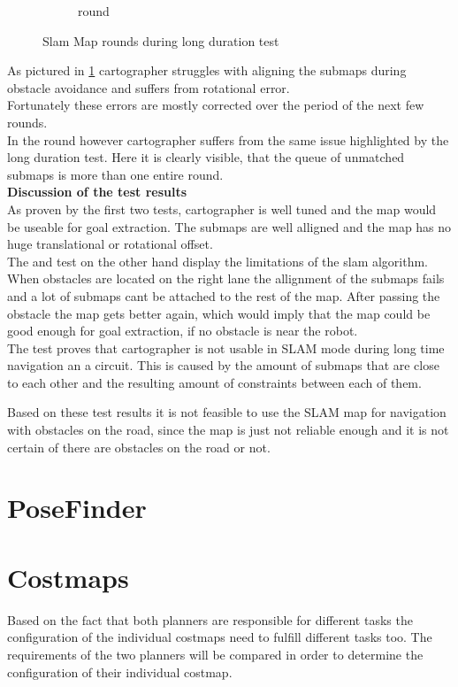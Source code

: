 \begin{figure}[H]
\begin{subfigure}{.3\linewidth}
		\caption{ round}
	\end{subfigure}

	\caption{Slam Map rounds during long duration test}
	\label{4slamtest}

\end{figure}

As pictured in \ref{4slamtest} cartographer struggles with aligning the submaps during obstacle avoidance and suffers from rotational error.\\
Fortunately these errors are mostly corrected over the period of the next few rounds.\\ In the  round however cartographer suffers from the same issue highlighted by the long duration test. Here it is clearly visible, that the queue of unmatched submaps is more than one entire round.\\

\textbf{Discussion of the test results}\\
As proven by the first two tests, cartographer is well tuned and the map would be useable for goal extraction. The submaps are well alligned and the map has no huge translational or rotational offset.\\

The  and  test on the other hand display the limitations of the slam algorithm.\\
When obstacles are located on the right lane the allignment of the submaps fails and a lot of submaps cant be attached to the rest of the map. After passing the obstacle the map gets better again, which would imply that the map could be good enough for goal extraction, if no obstacle is near the robot.\\
The  test proves that cartographer is not usable in SLAM mode during long time navigation an a circuit. This is caused by the amount of submaps that are close to each other and the resulting amount of constraints between each of them.

Based on these test results it is not feasible to use the SLAM map for navigation with obstacles on the road, since the map is just not reliable enough and it is not certain of there are obstacles on the road or not. 

\section{PoseFinder}



\section{Costmaps}
Based on the fact that both planners are responsible for different tasks the configuration of the individual costmaps need to fulfill different tasks too. The requirements of the two planners will be compared in order to determine the configuration of their individual costmap.\\

